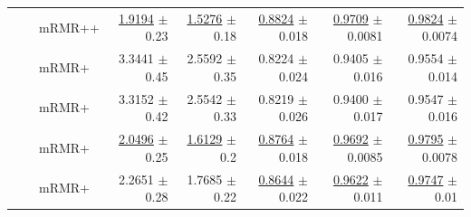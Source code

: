 \begin{longtable}{llp{}rrrrr}
 &  & mRMR++ & \underline{1.9194} {\scriptsize $\pm$ 0.23} & \underline{1.5276} {\scriptsize $\pm$ 0.18} & \underline{0.8824} {\scriptsize $\pm$ 0.018} & \underline{0.9709} {\scriptsize $\pm$ 0.0081} & \underline{0.9824} {\scriptsize $\pm$ 0.0074} \\
 &  & mRMR+ & 3.3441 {\scriptsize $\pm$ 0.45} & 2.5592 {\scriptsize $\pm$ 0.35} & 0.8224 {\scriptsize $\pm$ 0.024} & 0.9405 {\scriptsize $\pm$ 0.016} & 0.9554 {\scriptsize $\pm$ 0.014} \\
 &  & mRMR+ & 3.3152 {\scriptsize $\pm$ 0.42} & 2.5542 {\scriptsize $\pm$ 0.33} & 0.8219 {\scriptsize $\pm$ 0.026} & 0.9400 {\scriptsize $\pm$ 0.017} & 0.9547 {\scriptsize $\pm$ 0.016} \\
 &  & mRMR+ & \underline{2.0496} {\scriptsize $\pm$ 0.25} & \underline{1.6129} {\scriptsize $\pm$ 0.2} & \underline{0.8764} {\scriptsize $\pm$ 0.018} & \underline{0.9692} {\scriptsize $\pm$ 0.0085} & \underline{0.9795} {\scriptsize $\pm$ 0.0078} \\
 &  & mRMR+ & 2.2651 {\scriptsize $\pm$ 0.28} & 1.7685 {\scriptsize $\pm$ 0.22} & \underline{0.8644} {\scriptsize $\pm$ 0.022} & \underline{0.9622} {\scriptsize $\pm$ 0.011} & \underline{0.9747} {\scriptsize $\pm$ 0.01} \\
\end{longtable}